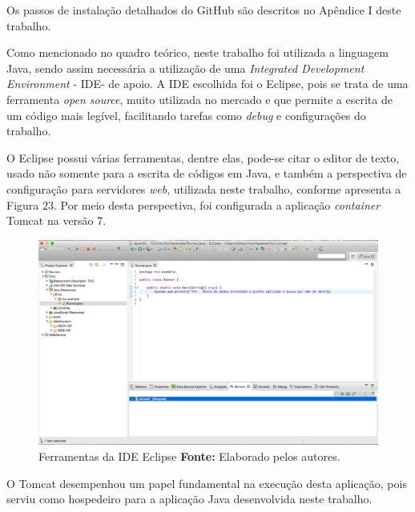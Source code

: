 \par Os passos de instalação detalhados do GitHub são descritos  no Apêndice I deste trabalho.

\par Como mencionado no quadro teórico, neste trabalho foi utilizada a linguagem Java, sendo assim necessária a utilização de uma \textit{Integrated Development Environment} - IDE\footnotemark[32] - de apoio. A IDE escolhida foi o Eclipse, pois se trata de uma ferramenta \textit{open source}, muito utilizada no mercado e que permite a escrita de um código mais legível, facilitando tarefas como \textit{debug} e configurações do trabalho.


\par O Eclipse possui várias ferramentas, dentre elas, pode-se citar o editor de texto, usado não somente para a escrita de códigos em Java, e também a perspectiva de configuração para servidores \textit{web}, utilizada neste trabalho, conforme apresenta a Figura 23. Por meio desta perspectiva, foi configurada a aplicação \textit{container} Tomcat na versão 7.

\newpage
\begin{figure}[h!]
	\centerline{\includegraphics[scale=0.35]{./imagens/eclipse-editor-texto.png}}
	\caption[Ferramentas da IDE Eclipse]
	{Ferramentas da IDE Eclipse \textbf{Fonte:} Elaborado pelos autores.}
	\label{fig:exemplo1}
\end{figure}

\par O Tomcat desempenhou um papel fundamental na execução desta aplicação, pois serviu como hospedeiro para a aplicação Java desenvolvida neste trabalho. 

